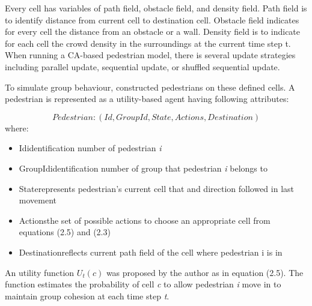 \documentclass[a4paper,11pt,phdthesis,singlespace,twoside]{cssethesis}
\begin{document}
Every cell has variables of path field, obstacle field, and density field. Path field is to identify distance from current cell to destination cell. Obstacle field indicates for every cell the distance from an obstacle or a wall. Density field is to indicate for each cell the crowd density in the surroundings at the current time step t. When running a CA-based pedestrian model, there is several update strategies including parallel update, sequential update, or shuffled sequential update. 

To simulate group behaviour, \cite{Bandini:2011} constructed pedestrians on these defined cells. A pedestrian is represented as a utility-based agent having following attributes:

\begin{equation}
Pedestrian: (Id,GroupId,State,Actions,Destination)
\end{equation}
where:
\begin{itemize}
  \item Id\textendash identification number of pedestrian \textit{i}
  \item GroupId\textendash identification number of group that pedestrian \textit{i} belongs to
  \item State\textendash represents pedestrian’s current cell that and direction followed in last movement
	\item Actions\textendash the set of possible actions to choose an appropriate cell from equations (2.5) and (2.3)
	\item Destination\textendash reflects current path field of the cell where pedestrian i is in
\end{itemize}

An utility function \begin{math}U_{t}(c)\end{math}  was proposed by the author as in equation (2.5). The function estimates the probability of cell \textit{c} to allow pedestrian \textit{i} move in to maintain group cohesion at each time step \textit{t}.
\end{document}
